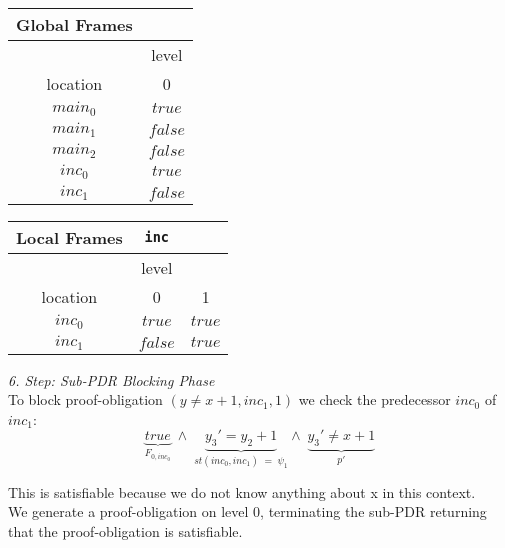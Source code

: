 \documentclass{article}
\newcommand\mycom[1]{}
\newcommand\mycom[1]{#1}
\newcommand{\jw}[1]{\mycom{\todo[color=blue!40,inline]{\small JW: #1}}}
\begin{document}
		\begin{minipage}{.5\textwidth}
		\setlength\tabcolsep{0.35em}
		\begin{center}
			\begin{tabu}{cc}
				Global Frames \\
				\toprule
				& level \\
				\cmidrule(lr){2-2}
				location & 0 \\
				$main_0$ & $true$ \\
				$main_1$ & $false$ \\
				$main_2$ & $false$ \\
				$inc_0$ & $true$ \\
				$inc_1$ & $false$\\
				\bottomrule
			\end{tabu}
		\end{center}
	\end{minipage}
	\hfill
	\begin{minipage}{.4\textwidth}
		\setlength\tabcolsep{0.35em}
		\begin{center}
			\begin{tabu}{ccc}
				Local Frames & \texttt{inc} \\
				\toprule
				& level \\
				\cmidrule(lr){2-2}
				location & 0 & 1 \\
				\cmidrule{1-3}
				$inc_0$ & $true$ & $true$ \\
				$inc_1$ & $false$ & $true$ \\
				\bottomrule
			\end{tabu}
		\end{center}	
	\end{minipage}
	
	\vspace*{1em}
	
	
	\textsl{6. Step: Sub-PDR Blocking Phase} \\
	To block proof-obligation $(y \neq x + 1, inc_1, 1)$ we check the predecessor $inc_0$ of $inc_1$: \\
		\begin{equation*}
		\underbrace{true}_{F_{0, inc_0}}\; \land \; \underbrace{y_3' = y_2 + 1}_{st(inc_0, inc_1)\; = \; \psi_1} \land \; \underbrace{y_3' \neq x + 1}_{p'}
		\end{equation*}
		\jw{In dem fall dass eine variable weder in In oder Out vorkommt ist sie Aux, oder einfach eine freie Variable? Hier x}
		This is satisfiable because we do not know anything about x in this context. \\
		We generate a proof-obligation on level 0, terminating the sub-PDR returning that the proof-obligation is satisfiable. \\ \\
	
\end{document}
